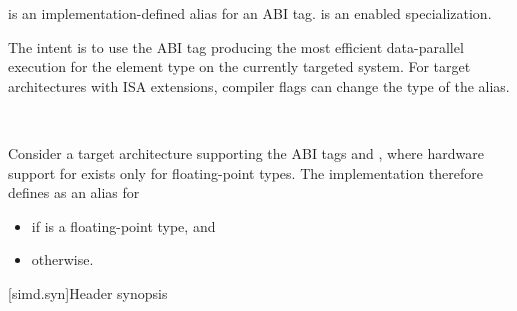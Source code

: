 \begin{itemdescr}

\pnum
{} is an implementation-defined alias for an ABI tag.
 is an enabled specialization.
\begin{note}
The intent is to use the ABI tag producing the most efficient data-parallel
execution for the element type  on the currently
targeted system.
For target architectures with ISA extensions, compiler flags can change the
type of the  alias.
\end{note}\\
\begin{example}
  Consider a target architecture supporting the ABI tags
   and , where hardware support for
   exists only for floating-point types.
  The implementation therefore defines  as an alias for
  \begin{itemize}
    \item {} if  is a floating-point type, and
    \item {} otherwise.
  \end{itemize}
\end{example}
\end{itemdescr}

[simd.syn]{Header \texorpdfstring{}{<simd>} synopsis}

